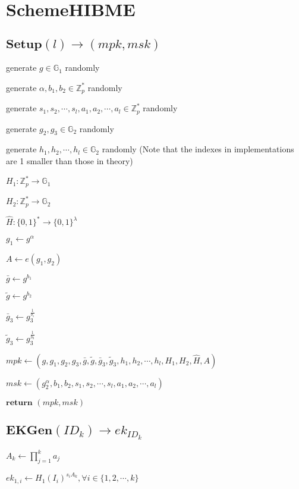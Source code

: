 \documentclass[a4paper]{article}
\begin{document}
\section{SchemeHIBME}

\subsection{$\textbf{Setup}(l) \rightarrow (\textit{mpk}, \textit{msk})$}

generate $g \in \mathbb{G}_1$ randomly

generate $\alpha, b_1, b_2 \in \mathbb{Z}_p^*$ randomly

generate $s_1, s_2, \cdots, s_l, a_1, a_2, \cdots, a_l \in \mathbb{Z}_p^*$ randomly

generate $g_2, g_3 \in \mathbb{G}_2$ randomly

generate $h_1, h_2, \cdots, h_l \in \mathbb{G}_2$ randomly (Note that the indexes in implementations are 1 smaller than those in theory)

$H_1:\mathbb{Z}_p^* \rightarrow \mathbb{G}_1$

$H_2:\mathbb{Z}_p^* \rightarrow \mathbb{G}_2$

$\hat{H}: \{0, 1\}^* \rightarrow \{0, 1\}^\lambda$

$g_1 \gets g^\alpha$

$A \gets e(g_1, g_2)$

$\bar{g} \gets g^{b_1}$

$\tilde{g} \gets g^{b_2}$

$\bar{g}_3 \gets g_3^{\frac{1}{b_1}}$

$\tilde{g}_3 \gets g_3^{\frac{1}{b_2}}$

$\textit{mpk} \gets (g, g_1, g_2, g_3, \bar{g}, \tilde{g}, \bar{g}_3, \tilde{g}_3, h_1, h_2, \cdots, h_l, H_1, H_2, \hat{H}, A)$

$\textit{msk} \gets (g_2^\alpha, b_1, b_2, s_1, s_2, \cdots, s_l, a_1, a_2, \cdots, a_l)$

$\textbf{return }(\textit{mpk}, \textit{msk})$

\subsection{$\textbf{EKGen}(\textit{ID}_k) \rightarrow \textit{ek}_{\textit{ID}_k}$}

$A_k \gets \prod\limits_{j = 1}^k a_j$

$\textit{ek}_{1, i} \gets H_1(I_i)^{s_i A_k}, \forall i \in \{1, 2, \cdots, k\}$
\end{document}

